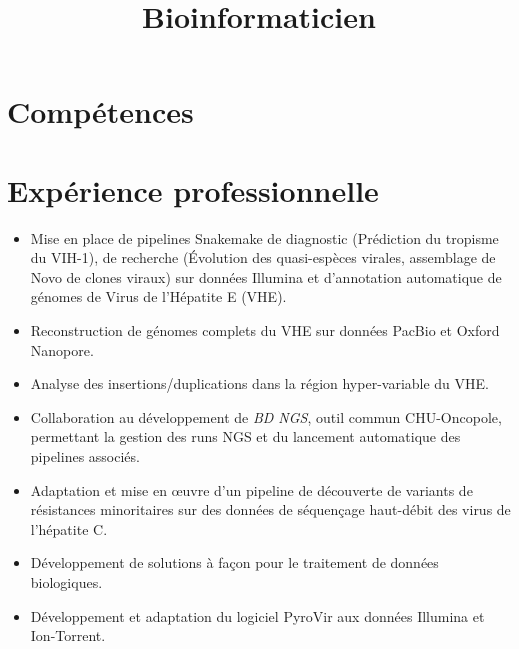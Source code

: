 \documentclass[11pt,a4paper,sans]{moderncv}
\title{Bioinformaticien}
\begin{document}
\makecvtitle

\section{Compétences}

\section{Expérience professionnelle}
{
\begin{itemize}
\item Mise en place de pipelines Snakemake de diagnostic (Prédiction du tropisme du VIH-1), de recherche (Évolution des quasi-espèces virales, assemblage de Novo de clones viraux) sur données Illumina et d'annotation automatique de génomes de Virus de l'Hépatite E (VHE).
\item Reconstruction de génomes complets du VHE sur données PacBio et Oxford Nanopore.
\item Analyse des insertions/duplications dans la région hyper-variable du VHE.
\item Collaboration au développement de \emph{BD NGS}, outil commun CHU-Oncopole, permettant la gestion des runs NGS et du lancement automatique des pipelines associés.
\item Adaptation et mise en œuvre d'un pipeline de découverte de variants de résistances minoritaires sur des données de séquençage haut-débit des virus de l'hépatite C.
\item Développement de solutions à façon pour le traitement de données biologiques.
\item Développement et adaptation du logiciel PyroVir aux données Illumina et Ion-Torrent.
\end{itemize}}
\end{document}
